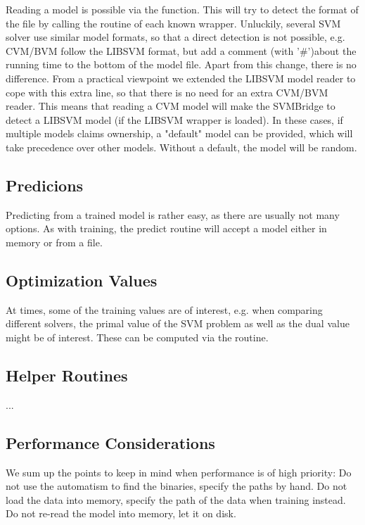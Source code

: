 \documentclass[article]{jss}
\begin{document}
Reading a model is possible via the  function.
This will try to detect the format of the file by calling the 
 routine of each known wrapper.
Unluckily, several SVM solver use similar model formats, so that
a direct detection is not possible, e.g. CVM/BVM follow the LIBSVM
format, but add a comment (with '\#')about the running time to the
bottom of the model file. Apart from this change, there is no difference.
From a practical viewpoint we extended the LIBSVM model reader
to cope with this extra line, so that there is no need for an extra CVM/BVM reader.
This means that reading a CVM model will make the SVMBridge to detect a LIBSVM
model (if the LIBSVM wrapper is loaded).
In these cases, if multiple models claims ownership, a "default" model can be provided,
which will take precedence over other models. Without a default,
the model will be random.


\subsection{Predicions}

Predicting from a trained model is rather easy, as there are usually not many options.
As with training, the predict routine will accept a model either in memory or from a file.


\subsection{Optimization Values}

At times, some of the training values are of interest,
e.g. when comparing different solvers, the primal value
of the SVM problem as well as the dual value might  be of interest.
These can be computed via the  routine.

\subsection{Helper Routines}

...


\subsection{Performance Considerations}

We sum up the points to keep in mind when performance is of high priority:
Do not use the automatism to find the binaries, specify the paths by hand.
Do not load the data into memory, specify the path of the data when training instead.
Do not re-read the model into memory, let it on disk.
\end{document}

